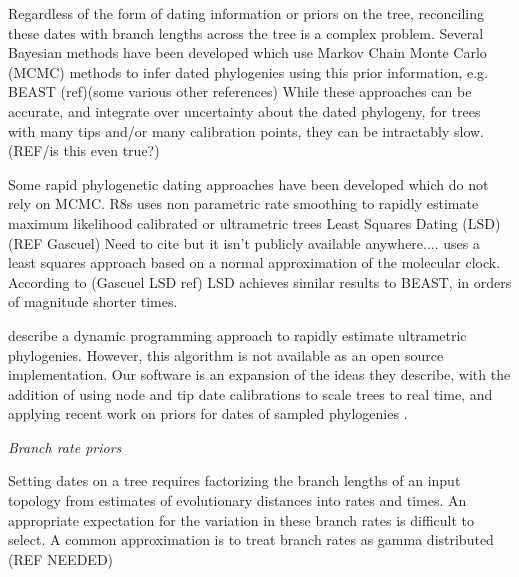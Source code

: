 \documentclass[12pt,letterpaper]{article}
\newcommand{\ejmcomment}[1]{{\color{green} #1}}
\renewcommand{\subsection}[1]{%
\bigskip
\begin{center}
\begin{large}
\normalfont\itshape #1
\end{large}
\end{center}}
\begin{document}
Regardless of the form of dating information or priors on the tree,
reconciling these dates with branch lengths across the tree is a complex problem.
Several Bayesian methods have been developed which use Markov Chain Monte Carlo (MCMC) methods
to infer dated phylogenies using this prior information, e.g. BEAST (ref)(some various other references)
While these approaches can be accurate, and integrate over uncertainty about the dated
phylogeny, for trees with many tips and/or many calibration points, they can be intractably slow. 
(REF/is this even true?)

Some rapid phylogenetic dating approaches have been developed which do not rely on MCMC.
R8s uses non parametric rate smoothing to rapidly estimate maximum likelihood calibrated or ultrametric trees \citep{Sanderson2003}
Least Squares Dating (LSD) (REF Gascuel) 
\ejmcomment{Need to cite but it isn't publicly available anywhere....}
uses a least squares approach based on a normal approximation of the molecular clock.
According to (Gascuel LSD ref) LSD achieves similar results to BEAST, in orders of magnitude shorter times.

\cite{Akerborg2008} describe a dynamic programming approach to 
rapidly estimate ultrametric phylogenies. 
However, this algorithm is not available as an open source implementation.
Our software is an expansion of the ideas they describe, 
with the addition of using node and tip date calibrations to scale trees to real time,
and applying recent work on  priors for dates of sampled phylogenies \citep{Stadler2010}.

\subsection{Branch rate priors}
Setting dates on a tree requires factorizing the branch lengths of an input topology
from estimates of evolutionary distances into rates and times. 
An appropriate expectation for the variation in these branch rates is difficult to select.
A common approximation is to treat branch rates as gamma distributed (REF NEEDED)
\end{document}
